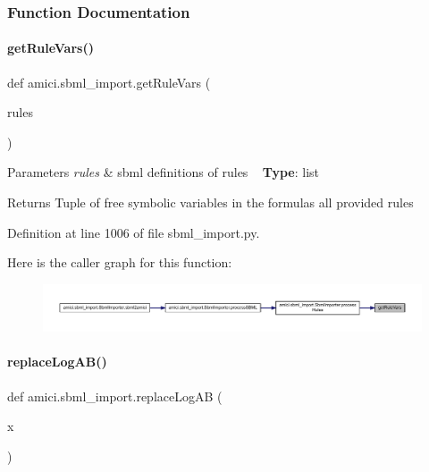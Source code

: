 \subsubsection{Function Documentation}
\mbox{\label{namespaceamici_1_1sbml__import_a64a5d0187cb4b3f69bceceb7d5638691}} 
\paragraph{\texorpdfstring{getRuleVars()}{getRuleVars()}}
{\footnotesize\ttfamily def amici.\+sbml\+\_\+import.\+get\+Rule\+Vars (\begin{DoxyParamCaption}\item[{}]{rules }\end{DoxyParamCaption})}


\begin{DoxyParams}{Parameters}
{\em rules} & sbml definitions of rules ~\newline
{\bfseries{Type}}\+: list\\
\hline
\end{DoxyParams}
\begin{DoxyReturn}{Returns}
Tuple of free symbolic variables in the formulas all provided rules 
\end{DoxyReturn}


Definition at line 1006 of file sbml\+\_\+import.\+py.

Here is the caller graph for this function\+:
\nopagebreak
\begin{figure}[H]
\begin{center}
\leavevmode
\includegraphics[width=350pt]{namespaceamici_1_1sbml__import_a64a5d0187cb4b3f69bceceb7d5638691_icgraph}
\end{center}
\end{figure}
\mbox{\label{namespaceamici_1_1sbml__import_a178c633ce1bc7f2af378ce56bd404541}} 
\paragraph{\texorpdfstring{replaceLogAB()}{replaceLogAB()}}
{\footnotesize\ttfamily def amici.\+sbml\+\_\+import.\+replace\+Log\+AB (\begin{DoxyParamCaption}\item[{}]{x }\end{DoxyParamCaption})}

